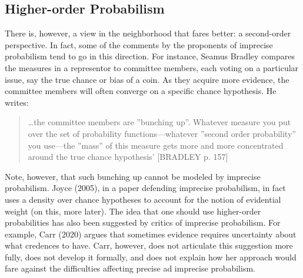 \documentclass[
  10pt,
  dvipsnames,enabledeprecatedfontcommands]{scrartcl}
\begin{document}
\hypertarget{higher-order-probabilism}{%
\subsection{Higher-order Probabilism}\label{higher-order-probabilism}}

There is, however, a view in the neighborhood that fares better: a
second-order perspective. In fact, some of the comments by the
proponents of imprecise probabilism tend to go in this direction. For
instance, Seamus Bradley compares the measures in a representor to
committee members, each voting on a particular issue, say the true
chance or bias of a coin. As they acquire more evidence, the committee
members will often converge on a specific chance hypothesis. He writes:

\begin{quote}
\dots the committee members are ''bunching up''. Whatever measure you put over the set of probability functions---whatever ''second order probability'' you use---the ''mass'' of this measure gets more and more concentrated around the true chance hypothesis' [BRADLEY p. 157] 
\end{quote}

\noindent Note, however, that such bunching up cannot be modeled by
imprecise probabilism. Joyce (2005), in a paper defending imprecise
probabilism, in fact uses a density over chance hypotheses to account
for the notion of evidential weight (on this, more later). The idea that
one should use higher-order probabilities has also been suggested by
critics of imprecise probabilism. For example, Carr (2020) argues that
sometimes evidence requires uncertainty about what credences to have.
Carr, however, does not articulate this suggestion more fully, does not
develop it formally, and does not explain how her approach would fare
against the difficulties affecting precise ad imprecise probabilism.
\end{document}
